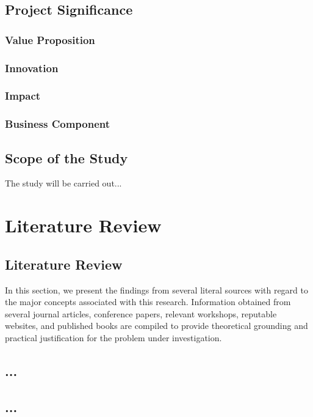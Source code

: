 \section{Project Significance} \label{researchsignificance}
\subsection{Value Proposition}

\subsection{Innovation}

\subsection{Impact}

\subsection{Business Component}

\section{Scope of the Study}
\noindent The study will be carried out...

\chapter{Literature Review}\label{chapter:Literature_Review}
\section{Literature Review}
In this section, we present the findings from several literal sources with regard to the major concepts associated with this research. Information obtained from several journal articles, conference papers, relevant workshops, reputable websites, and published books are compiled to provide theoretical grounding and practical justification for the problem under investigation.

\section{...}


\section{...}


